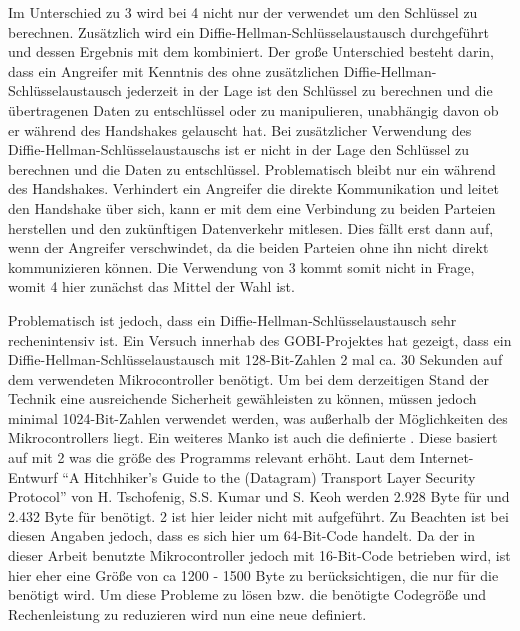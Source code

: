 Im Unterschied zu  3 wird bei  4 nicht nur der  verwendet um den Schlüssel zu berechnen. Zusätzlich wird ein
Diffie-Hellman-Schlüsselaustausch durchgeführt und dessen Ergebnis mit dem  kombiniert. Der große Unterschied besteht darin, dass
ein Angreifer mit Kenntnis des  ohne zusätzlichen Diffie-Hellman-Schlüsselaustausch jederzeit in der Lage ist den Schlüssel zu
berechnen und die übertragenen Daten zu entschlüssel oder zu manipulieren, unabhängig davon ob er während des Handshakes gelauscht hat.
Bei zusätzlicher Verwendung des Diffie-Hellman-Schlüsselaustauschs ist er nicht in der Lage den Schlüssel zu berechnen und die Daten zu
entschlüssel. Problematisch bleibt nur ein  während des Handshakes. Verhindert ein Angreifer die direkte
Kommunikation und leitet den Handshake über sich, kann er mit dem  eine Verbindung zu beiden Parteien herstellen und den
zukünftigen Datenverkehr mitlesen. Dies fällt erst dann auf, wenn der Angreifer verschwindet, da die beiden Parteien ohne ihn nicht
direkt kommunizieren können. Die Verwendung von  3 kommt somit nicht in Frage, womit  4 hier zunächst das Mittel
der Wahl ist.

Problematisch ist jedoch, dass ein Diffie-Hellman-Schlüsselaustausch sehr rechenintensiv ist. Ein Versuch innerhab des GOBI-Projektes hat
gezeigt, dass ein Diffie-Hellman-Schlüsselaustausch mit 128-Bit-Zahlen 2 mal ca. 30 Sekunden auf dem verwendeten Mikrocontroller benötigt.
Um bei dem derzeitigen Stand der Technik eine ausreichende Sicherheit gewähleisten zu können, müssen jedoch minimal 1024-Bit-Zahlen
verwendet werden, was außerhalb der Möglichkeiten des Mikrocontrollers liegt. Ein weiteres Manko ist auch die definierte .
Diese basiert auf  mit 2 was die größe des Programms relevant erhöht. Laut dem Internet-Entwurf "`A Hitchhiker's
Guide to the (Datagram) Transport Layer Security Protocol"' \cite{draftmintls} von H. Tschofenig, S.S. Kumar und S. Keoh werden
2.928 Byte für  und 2.432 Byte für  benötigt. 2 ist hier leider nicht mit aufgeführt. Zu Beachten ist bei diesen Angaben
jedoch, dass es sich hier um 64-Bit-Code handelt. Da der in dieser Arbeit benutzte Mikrocontroller jedoch mit 16-Bit-Code betrieben wird, ist hier
eher eine Größe von ca 1200 - 1500 Byte zu berücksichtigen, die nur für die  benötigt wird. Um diese Probleme zu lösen bzw. die benötigte
Codegröße und Rechenleistung zu reduzieren wird nun eine neue  definiert.

